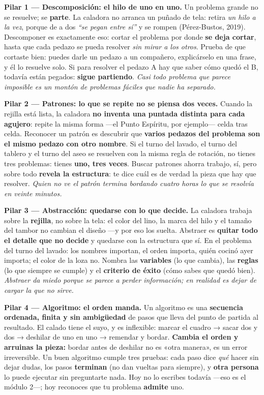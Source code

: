 \documentclass[11pt,letterpaper]{article}
\newcommand{\milcpaso}[3]{%
\Needspace{4\baselineskip}%
\begin{tcolorbox}[enhanced,colback=white,colframe=milcLinea,arc=1.5mm,boxrule=.9pt,
  left=14mm,right=4mm,top=3mm,bottom=3mm,before skip=4pt,after skip=4pt,
  fontupper=\RaggedRight,
  overlay={\node[anchor=north west,circle,fill=#2,text=white,inner sep=0pt,
    minimum size=7.4mm,font=\sffamily\bfseries\small]
    at ([xshift=3.6mm,yshift=-3.2mm]frame.north west) {#1};}]
#3
\end{tcolorbox}}
\begin{document}
\milcpaso{1}{milcTurquesa}{\textbf{Pilar 1 --- Descomposición: el hilo de uno en uno.} Un problema grande no se resuelve; se \textbf{parte}. La caladora no arranca un puñado de tela: retira \emph{un hilo a la vez}, porque de a dos \emph{``se pegan entre sí''} y se rompen (Pérez-Bustos, 2019). Descomponer es exactamente eso: cortar el problema por donde \textbf{se deja cortar}, hasta que cada pedazo se pueda resolver \emph{sin mirar a los otros}. Prueba de que cortaste bien: puedes darle un pedazo a un compañero, explicárselo en una frase, y él lo resuelve solo. Si para resolver el pedazo A hay que saber cómo quedó el B, todavía están pegados: \textbf{sigue partiendo}. \emph{Casi todo problema que parece imposible es un montón de problemas fáciles que nadie ha separado.}}
\milcpaso{2}{milcTurquesa}{\textbf{Pilar 2 --- Patrones: lo que se repite no se piensa dos veces.} Cuando la rejilla está lista, la caladora \textbf{no inventa una puntada distinta para cada agujero}: repite la misma forma ---el Punto Espíritu, por ejemplo--- celda tras celda. Reconocer un patrón es descubrir que \textbf{varios pedazos del problema son el mismo pedazo con otro nombre}. Si el turno del lavado, el turno del tablero y el turno del aseo se resuelven con la misma regla de rotación, no tienes tres problemas: tienes \textbf{uno, tres veces}. Buscar patrones ahorra trabajo, sí, pero sobre todo \textbf{revela la estructura}: te dice cuál es de verdad la pieza que hay que resolver. \emph{Quien no ve el patrón termina bordando cuatro horas lo que se resolvía en veinte minutos.}}
\milcpaso{3}{milcTurquesa}{\textbf{Pilar 3 --- Abstracción: quedarse con lo que decide.} La caladora trabaja sobre la \textbf{rejilla}, no sobre la tela: el color del lino, la marca del hilo y el tamaño del tambor no cambian el diseño ---y por eso los suelta. Abstraer es \textbf{quitar todo el detalle que no decide} y quedarse con la estructura que sí. En el problema del turno del lavado: los nombres importan, el orden importa, quién cocinó ayer importa; el color de la loza no. Nombra las \textbf{variables} (lo que cambia), las \textbf{reglas} (lo que siempre se cumple) y el \textbf{criterio de éxito} (cómo sabes que quedó bien). \emph{Abstraer da miedo porque se parece a perder información; en realidad es dejar de cargar la que no sirve.}}
\milcpaso{4}{milcTurquesa}{\textbf{Pilar 4 --- Algoritmo: el orden manda.} Un algoritmo es una \textbf{secuencia ordenada, finita y sin ambigüedad} de pasos que lleva del punto de partida al resultado. El calado tiene el suyo, y es inflexible: marcar el cuadro → sacar dos y dos → deshilar de uno en uno → remendar y bordar. \textbf{Cambia el orden y arruinas la pieza:} bordar antes de deshilar no es «otra manera», es un error irreversible. Un buen algoritmo cumple tres pruebas: cada paso dice \emph{qué} hacer sin dejar dudas, los pasos \textbf{terminan} (no dan vueltas para siempre), y \textbf{otra persona} lo puede ejecutar sin preguntarte nada. Hoy no lo escribes todavía ---eso es el módulo 2---; hoy reconoces que tu problema \textbf{admite} uno.}
\end{document}

